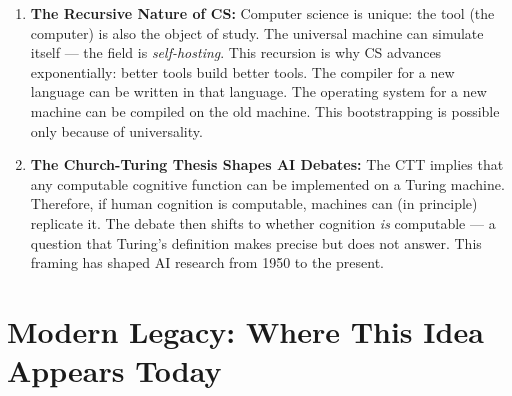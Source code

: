 \begin{enumerate}
\item \textbf{The Recursive Nature of CS:} Computer science is unique: the tool (the computer) is also the object of study. The universal machine can simulate itself --- the field is \emph{self-hosting}. This recursion is why CS advances exponentially: better tools build better tools. The compiler for a new language can be written in that language. The operating system for a new machine can be compiled on the old machine. This bootstrapping is possible only because of universality.

\item \textbf{The Church-Turing Thesis Shapes AI Debates:} The CTT implies that any computable cognitive function can be implemented on a Turing machine. Therefore, if human cognition is computable, machines can (in principle) replicate it. The debate then shifts to whether cognition \emph{is} computable --- a question that Turing's definition makes precise but does not answer. This framing has shaped AI research from 1950 to the present.
\end{enumerate}

\section{Modern Legacy: Where This Idea Appears Today}
\label{sec:computation:legacy}

